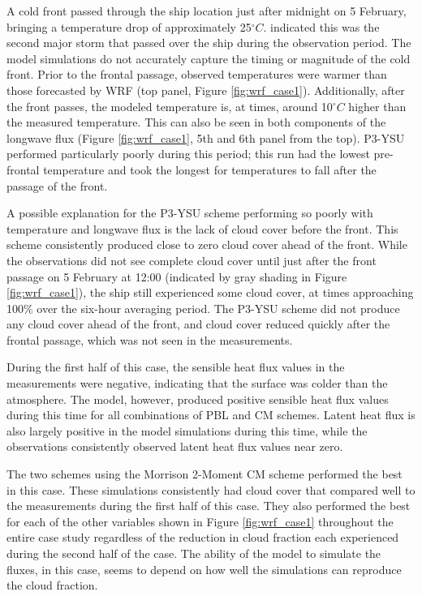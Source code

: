 A cold front passed through the ship location just after midnight on 5 February, bringing a temperature drop of approximately 25$^{\circ}C$. \citet{cohen:2017} indicated this was the second major storm that passed over the ship during the observation period. The model simulations do not accurately capture the timing or magnitude of the cold front. Prior to the frontal passage, observed temperatures were warmer than those forecasted by WRF (top panel, Figure \ref{fig:wrf_case1}). Additionally, after the front passes, the modeled temperature is, at times, around 10$^{\circ}C$ higher than the measured temperature. This can also be seen in both components of the longwave flux (Figure \ref{fig:wrf_case1}, 5th and 6th panel from the top). P3-YSU performed particularly poorly during this period; this run had the lowest pre-frontal temperature and took the longest for temperatures to fall after the passage of the front.

A possible explanation for the P3-YSU scheme performing so poorly with temperature and longwave flux is the lack of cloud cover before the front. This scheme consistently produced close to zero cloud cover ahead of the front. While the observations did not see complete cloud cover until just after the front passage on 5 February at 12:00 (indicated by gray shading in Figure \ref{fig:wrf_case1}), the ship still experienced some cloud cover, at times approaching 100$\%$ over the six-hour averaging period. The P3-YSU scheme did not produce any cloud cover ahead of the front, and cloud cover reduced quickly after the frontal passage, which was not seen in the measurements. 

During the first half of this case, the sensible heat flux values in the measurements were negative, indicating that the surface was colder than the atmosphere. The model, however, produced positive sensible heat flux values during this time for all combinations of PBL and CM schemes. Latent heat flux is also largely positive in the model simulations during this time, while the observations consistently observed latent heat flux values near zero. 

The two schemes using the Morrison 2-Moment CM scheme performed the best in this case. These simulations consistently had cloud cover that compared well to the measurements during the first half of this case. They also performed the best for each of the other variables shown in Figure \ref{fig:wrf_case1} throughout the entire case study regardless of the reduction in cloud fraction each experienced during the second half of the case. The ability of the model to simulate the fluxes, in this case, seems to depend on how well the simulations can reproduce the cloud fraction.

